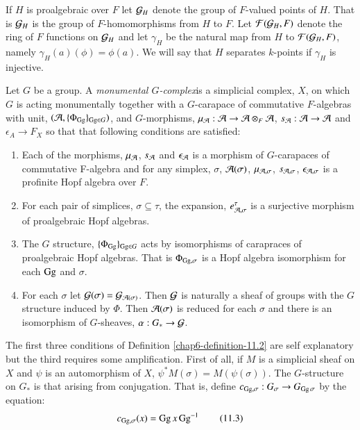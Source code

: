 If $H$ is proalgebraic over $F$ let $\mathcal{G}_{H}$ denote the group of $F$-valued points of $H$. That is $\mathcal{G}_{H}$ is the group of $F$-homomorphisms from $H$ to $F$. Let $\mathcal{F}(\mathcal{G}_{H}, F)$ denote the ring of $F$ functions on $\mathcal{G}_{H}$ and let $\gamma_{H}$ be the natural map from $H$ to $\mathcal{F}(\mathcal{G}_{H}, F)$, namely $\gamma_{H}(a)(\phi) = \phi(a)$. We will say that $H$ separates $k$-points if $\gamma_{H}$ is injective.

\begin{definition}\label{chap6-definition-11.2}
Let $G$ be a group. A \textit{monumental $G$-complex}is a simplicial complex, $X$, on which $G$ is acting monumentally together with a $G$-carapace of commutative $F$-algebras with unit, $(\mathcal{A}, \{\Phi_{\operatorname{Gg}}\}_{\operatorname{Gg} \in G})$, and $G$-morphisms, $\mu_{\mathcal{A}} : \mathcal{A} \rightarrow \mathcal{A} \otimes_{F} \mathcal{A}$, $s_{\mathcal{A}} : \mathcal{A} \rightarrow \mathcal{A}$ and $\epsilon_{A} \rightarrow F_{X}$ so that that following conditions are satisfied:
\begin{enumerate}[{\rm(1)}]
\item Each of the morphisms, $\mu_{\mathcal{A}}$, $s_{\mathcal{A}}$ and $\epsilon_{\mathcal{A}}$ is a morphism of $G$-carapaces of commutative F-algebra and for any simplex, $\sigma$, $\mathcal{A}(\sigma)$, $\mu_{\mathcal{A}, \sigma}$, $s_{\mathcal{A}, \sigma}$, $\epsilon_{\mathcal{A}, \sigma}$ is a profinite Hopf algebra over $F$.\label{chap6-definition11.2-enum-1}

\item For each pair of simplices, $\sigma \subseteq \tau$, the expansion, $e_{\mathcal{A}, \sigma}^{\tau}$ is a surjective morphism of proalgebraic Hopf algebras.\label{chap6-definition11.2-enum-2}

\item The $G$ structure, $\{\Phi_{\operatorname{Gg}}\}_{\operatorname{Gg} \in G}$ acts by isomorphisms of carapraces of proalgebraic Hopf algebras. That is $\Phi_{\operatorname{Gg}, \sigma}$ is a Hopf algebra isomorphism for each $\operatorname{Gg}$ and $\sigma$.\label{chap6-definition11.2-enum-3}

\item For each $\sigma$ let $\mathcal{G}(\sigma) =\mathcal{G}_{\mathcal{A}(\sigma)}$. Then $\mathcal{G}$ is naturally a sheaf of groups with the $G$ structure induced by $\Phi$. Then $\mathcal{A}(\sigma)$ is reduced for each $\sigma$ and there is an isomorphism of $G$-sheaves, $\alpha : G_{*} \rightarrow \mathcal{G}$.\label{chap6-definition11.2-enum-4}
\end{enumerate}
\end{definition}

The first three conditions of Definition \ref{chap6-definition-11.2} are self explanatory but the third requires some amplification. First of all, if $M$ is a simplicial sheaf on $X$ and $\psi$ is an automorphism of $X$, $\psi^{*}M(\sigma) = M(\psi(\sigma))$. The $G$-structure on $G_{*}$ is that arising from conjugation. That is, define $c_{\operatorname{Gg}, \sigma} : G_{\sigma} \rightarrow G_{\operatorname{Gg} \sigma}$ by the equation:
\begin{equation*}\label{chap6-eq-11.3}
c_{\operatorname{Gg},\sigma}(x) = \operatorname{Gg} x \operatorname{Gg}^{-1}\tag{11.3}
\end{equation*}

